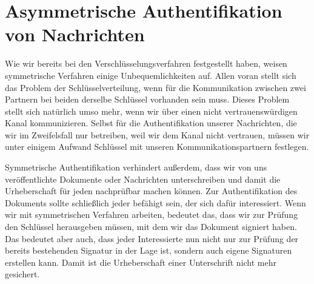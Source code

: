\chapter{Asymmetrische Authentifikation von Nachrichten}
\label{cha:asymmauth}

Wie wir bereits bei den Verschlüsselungsverfahren festgestellt haben, weisen symmetrische Verfahren einige Unbequemlichkeiten auf. Allen voran stellt sich das
Problem der Schlüsselverteilung, wenn für die Kommunikation zwischen zwei Partnern bei beiden derselbe Schlüssel vorhanden sein muss. Dieses Problem stellt sich
natürlich umso mehr, wenn wir über einen nicht vertrauenswürdigen Kanal kommunizieren. Selbst für die Authentifikation unserer Nachrichten, die wir im
Zweifelsfall nur betreiben, weil wir dem Kanal nicht vertrauen, müssen wir unter einigem Aufwand Schlüssel mit unseren Kommunikationspartnern festlegen.

Symmetrische Authentifikation verhindert außerdem, dass wir von uns veröffentlichte Dokumente oder Nachrichten unterschreiben und damit die Urheberschaft für
jeden nachprüfbar machen können. Zur Authentifikation des Dokuments sollte schließlich jeder befähigt sein, der sich dafür interessiert. Wenn wir mit
symmetrischen Verfahren arbeiten, bedeutet das, dass wir zur Prüfung den Schlüssel herausgeben müssen, mit dem wir das Dokument signiert haben. Das bedeutet
aber auch, dass jeder Interessierte nun nicht nur zur Prüfung der bereits bestehenden Signatur in der Lage ist, sondern auch eigene Signaturen erstellen kann.
Damit ist die Urheberschaft einer Unterschrift nicht mehr gesichert.

